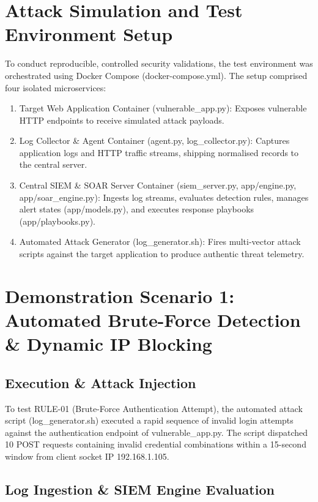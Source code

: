 \section{Attack Simulation and Test Environment Setup}

To conduct reproducible, controlled security validations, the test environment was orchestrated using Docker Compose (docker-compose.yml). The setup comprised four isolated microservices:

\begin{enumerate}
  \item Target Web Application Container (vulnerable\_app.py): Exposes vulnerable HTTP endpoints to receive simulated attack payloads.
  \item Log Collector \& Agent Container (agent.py, log\_collector.py): Captures application logs and HTTP traffic streams, shipping normalised records to the central server.
  \item Central SIEM \& SOAR Server Container (siem\_server.py, app/engine.py, app/soar\_engine.py): Ingests log streams, evaluates detection rules, manages alert states (app/models.py), and executes response playbooks (app/playbooks.py).
  \item Automated Attack Generator (log\_generator.sh): Fires multi-vector attack scripts against the target application to produce authentic threat telemetry.
\end{enumerate}

\section{Demonstration Scenario 1: Automated Brute-Force Detection \& Dynamic IP Blocking}

\subsection{Execution \& Attack Injection}

To test RULE-01 (Brute-Force Authentication Attempt), the automated attack script (log\_generator.sh) executed a rapid sequence of invalid login attempts against the authentication endpoint of vulnerable\_app.py. The script dispatched 10 POST requests containing invalid credential combinations within a 15-second window from client socket IP 192.168.1.105.

\subsection{Log Ingestion \& SIEM Engine Evaluation}

